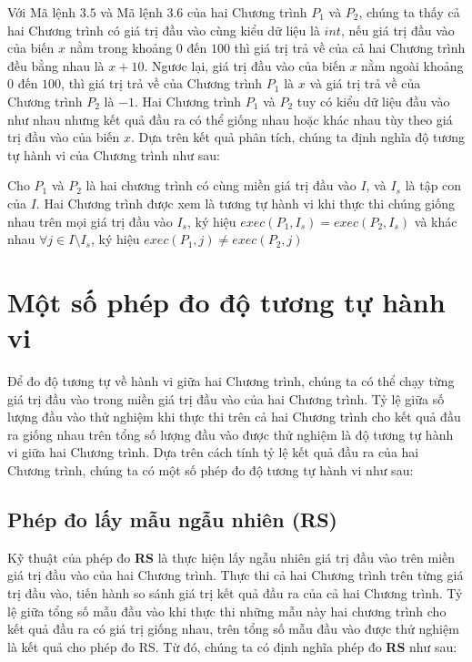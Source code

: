 \begin{minipage}[t]{0.45\linewidth}
	
\end{minipage}%
\hfill\vrule\hfill
\begin{minipage}[t]{0.45\linewidth}
	
\end{minipage}%

Với Mã lệnh $3.5$ và Mã lệnh $3.6$ của hai Chương trình $P_{1}$ và $P_{2}$, chúng ta thấy cả hai Chương trình có giá trị đầu vào cùng kiểu dữ liệu là $int$, nếu giá trị đầu vào của biến $x$ nằm trong khoảng $0$ đến $100$ thì giá trị trả về của cả hai Chương trình đều bằng nhau là $x+10$. Ngươc lại, giá trị đầu vào của biến $x$ nằm ngoài khoảng $0$ đến $100$, thì giá trị trả về của Chương trình $P_{1}$ là $x$ và giá trị trả về của Chương trình $P_{2}$ là $-1$. Hai Chương trình $P_{1}$ và $P_{2}$ tuy có kiểu dữ liệu đầu vào như nhau nhưng kết quả đầu ra có thể giống nhau hoặc khác nhau tùy theo giá trị đầu vào của biến $x$. Dựa trên kết quả phân tích, chúng ta định nghĩa độ tương tự hành vi của Chương trình như sau:

\begin{definition}
Cho $P_{1}$ và $P_{2}$ là hai chương trình có cùng miền giá trị đầu vào $I$, và $I_{s}$ là tập con của $I$. Hai Chương trình được xem là tương tự hành vi khi thực thi chúng giống nhau trên mọi giá trị đầu vào $I_{s}$, ký hiệu  $exec(P_{1}, I_{s}) = exec(P_{2}, I_{s})$ và khác nhau $\forall j \in I \setminus I_{s}$, ký hiệu $exec(P_{1}, j) \neq exec(P_{2}, j)$
\end{definition}

\section{Một số phép đo độ tương tự hành vi}
Để đo độ tương tự về hành vi giữa hai Chương trình, chúng ta có thể chạy từng giá trị đầu vào trong miền giá trị đầu vào của hai Chương trình. Tỷ lệ giữa số lượng đầu vào thử nghiệm khi thực thi trên cả hai Chương trình cho kết quả đầu ra giống nhau trên tổng số lượng đầu vào được thử nghiệm là độ tương tự hành vi giữa hai Chương trình. Dựa trên cách tính tỷ lệ kết quả đầu ra của hai Chương trình, chúng ta có một số phép đo độ tương tự hành vi như sau:

\subsection{Phép đo lấy mẫu ngẫu nhiên (RS)}
Kỹ thuật của phép đo \textbf{RS} là thực hiện lấy ngẫu nhiên giá trị đầu vào trên miền giá trị đầu vào của hai Chương trình. Thực thi cả hai Chương trình trên từng giá trị đầu vào, tiến hành so sánh giá trị kết quả đầu ra của cả hai Chương trình. Tỷ lệ giữa tổng số mẫu đầu vào khi thực thi những mẫu này hai chương trình cho kết quả đầu ra có giá trị giống nhau, trên tổng số mẫu đầu vào được thử nghiệm là kết quả cho phép đo RS. Từ đó, chúng ta có định nghĩa phép đo \textbf{RS} như sau:
 
